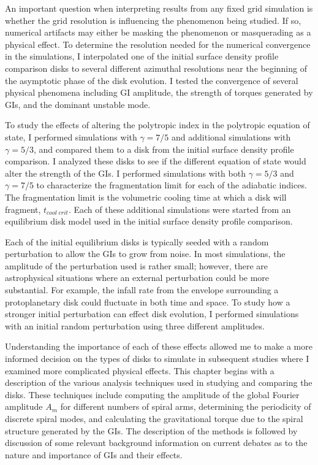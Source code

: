 An important question when interpreting results from any fixed grid simulation is whether the grid resolution is influencing the phenomenon being studied. If so, numerical artifacts may either be masking the phenomenon or masquerading as a physical effect. To determine the resolution needed for the numerical convergence in the simulations, I interpolated one of the initial surface density profile comparison disks to several different azimuthal resolutions near the beginning of the asymptotic phase of the disk evolution. I tested the convergence of several physical phenomena including GI amplitude, the strength of torques generated by GIs, and the dominant unstable mode.

To study the effects of altering the polytropic index in the polytropic equation of state, I performed simulations with $\gamma = 7/5$ and additional simulations with $\gamma = 5/3$, and compared them to a disk from the initial surface density profile comparison. I analyzed these disks to see if the different equation of state would alter the strength of the GIs. I performed simulations with both $\gamma = 5/3$ and $\gamma = 7/5$ to characterize the fragmentation limit for each of the adiabatic indices. The fragmentation limit is the volumetric cooling time at which a disk will fragment, $t_{cool \; crit}$. Each of these additional simulations were started from an equilibrium disk model used in the initial surface density profile comparison. 

Each of the initial equilibrium disks is typically seeded with a random perturbation to allow the GIs to grow from noise. In most simulations, the amplitude of the perturbation used is rather small; however, there are astrophysical situations where an external perturbation could be more substantial. For example, the infall rate from the envelope surrounding a protoplanetary disk could fluctuate in both time and space. To study how a stronger initial perturbation can effect disk evolution, I performed simulations with an initial random perturbation using three different amplitudes.

Understanding the importance of each of these effects allowed me to make a more informed decision on the types of disks to simulate in subsequent studies where I examined more complicated physical effects. This chapter begins with a description of the various analysis techniques used in studying and comparing the disks. These techniques include computing the amplitude of the global Fourier amplitude $A_m$ for different numbers of spiral arms, determining the periodicity of discrete spiral modes, and calculating the gravitational torque due to the spiral structure generated by the GIs. The description of the methods is followed by discussion of some relevant background information on current debates as to the nature and importance of GIs and their effects.

